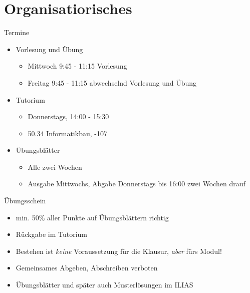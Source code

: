 

\section{Organisatiorisches}

\begin{frame}{Termine}
	\begin{itemize}
		\pause
		\item Vorlesung und Übung
		\pause
			\begin{itemize}
				\item Mittwoch 9:45 - 11:15 Vorlesung
				\item Freitag 9:45 - 11:15 abwechselnd Vorlesung und Übung
			\end{itemize}
		
		\pause
		\item Tutorium
		\pause
			\begin{itemize}
				\item Donnerstags, 14:00 - 15:30
				\item 50.34 Informatikbau, -107
			\end{itemize}
		
		\pause
		\item Übungsblätter
		\pause
		\begin{itemize}
			\item Alle zwei Wochen
			\item Ausgabe Mittwochs, Abgabe Donnerstags bis 16:00 zwei Wochen drauf %
		\end{itemize}
	\end{itemize}
\end{frame}

\begin{frame}{Übungsschein}
	\begin{itemize}
		\pause
		\item min. 50\% aller Punkte auf Übungsblättern richtig\pause
		\item Rückgabe im Tutorium\pause
		\item Bestehen ist \emph{keine} Voraussetzung für die Klausur\pause , \emph{aber} fürs Modul!\pause
		\item Gemeinsames Abgeben, Abschreiben verboten\pause
		\item Übungsblätter und später auch Musterlösungen im ILIAS
	\end{itemize}
\end{frame}

